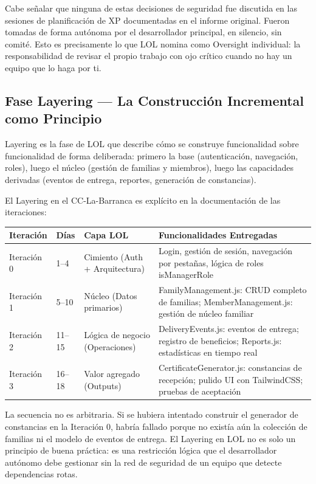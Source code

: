 \documentclass[14pt,a4paper,oneside]{extbook}
\begin{document}
Cabe señalar que ninguna de estas decisiones de seguridad fue discutida en las sesiones de planificación de XP documentadas en el informe original. Fueron tomadas de forma autónoma por el desarrollador principal, en silencio, sin comité. Esto es precisamente lo que LOL nomina como Oversight individual: la responsabilidad de revisar el propio trabajo con ojo crítico cuando no hay un equipo que lo haga por ti.



\subsection{Fase Layering — La Construcción Incremental como Principio}

Layering es la fase de LOL que describe cómo se construye funcionalidad sobre funcionalidad de forma deliberada: primero la base (autenticación, navegación, roles), luego el núcleo (gestión de familias y miembros), luego las capacidades derivadas (eventos de entrega, reportes, generación de constancias).

El Layering en el CC-La-Barranca es explícito en la documentación de las iteraciones:



\begin{table}[htbp]
\centering
\begin{tabular}{p{} p{} p{} p{}}
\toprule
\textbf{Iteración} & \textbf{Días} & \textbf{Capa LOL} & \textbf{Funcionalidades Entregadas} \\
\midrule
Iteración 0 & 1–4 & Cimiento (Auth + Arquitectura) & Login, gestión de sesión, navegación por pestañas, lógica de roles isManagerRole \\
Iteración 1 & 5–10 & Núcleo (Datos primarios) & FamilyManagement.js: CRUD completo de familias; MemberManagement.js: gestión de núcleo familiar \\
Iteración 2 & 11–15 & Lógica de negocio (Operaciones) & DeliveryEvents.js: eventos de entrega; registro de beneficios; Reports.js: estadísticas en tiempo real \\
Iteración 3 & 16–18 & Valor agregado (Outputs) & CertificateGenerator.js: constancias de recepción; pulido UI con TailwindCSS; pruebas de aceptación \\
\bottomrule
\end{tabular}
\end{table}



La secuencia no es arbitraria. Si se hubiera intentado construir el generador de constancias en la Iteración 0, habría fallado porque no existía aún la colección de familias ni el modelo de eventos de entrega. El Layering en LOL no es solo un principio de buena práctica: es una restricción lógica que el desarrollador autónomo debe gestionar sin la red de seguridad de un equipo que detecte dependencias rotas.
\end{document}
